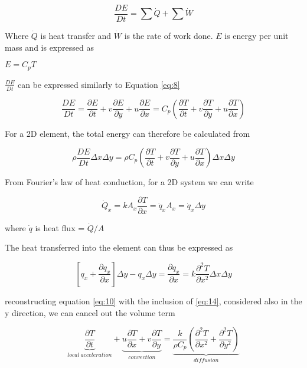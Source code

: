     \begin{equation} \label{eq:10}
      \frac{DE}{Dt} = \sum{\dot{Q}} + \sum{\dot{W}}
    \end{equation}

    Where $\dot{Q}$ is heat transfer and $\dot{W}$ is the rate of work done. $E$ is energy per unit mass and is expressed as

    \centerline{$E = C_{p} T$}

    $\frac{DE}{Dt}$ can be expressed similarly to Equation \ref{eq:8}

    \begin{equation} \label{eq:11}
      \frac{DE}{Dt} = \frac{\partial E}{\partial t} + v \frac{\partial E}{\partial y} + u \frac{\partial E}{\partial x} = C_{p} (\frac{\partial T}{\partial t} + v \frac{\partial T}{\partial y} + u \frac{\partial T}{\partial x})
    \end{equation}

    For a 2D element, the total energy can therefore be calculated from

    \begin{equation} \label{eq:12}
      \rho \frac{DE}{Dt} \Delta x \Delta y = \rho   C_{p} (\frac{\partial T}{\partial t} + v \frac{\partial T}{\partial y} + u \frac{\partial T}{\partial x}) \Delta x \Delta y
    \end{equation}

    From Fourier's law of heat conduction, for a 2D system we can write

    \begin{equation} \label{eq:13}
      \dot{Q}_{x} = k A_{x} \frac{\partial T}{\partial x} = \dot{q}_{x} A_{x} = \dot{q}_{x} \Delta y
    \end{equation}

    where $\dot{q}$ is heat flux = $\dot{Q}/A$

    The heat transferred into the element can thus be expressed as

    \begin{equation} \label{eq:14}
      [q_{x} + \frac{\partial q_{x}}{\partial x}] \Delta y - q_{x} \Delta y = \frac{\partial q_{x}}{\partial x} = k \frac{\partial^2 T}{\partial x^2} \Delta x \Delta y
    \end{equation}

    reconstructing equation \ref{eq:10} with the inclusion of \ref{eq:14}, considered also in the y direction, we can cancel out the volume term

    \begin{equation} \label{eq:15}
      \underbrace{\frac{\partial T}{\partial t}}_{local\ acceleration} + \underbrace{u \frac{\partial T}{\partial x} + v \frac{\partial T}{\partial y}}_{convection} = \underbrace{\frac{k}{\rho C_{p}} ( \frac{\partial^2 T}{\partial x^2} + \frac{\partial^2 T}{\partial y^2} )}_{diffusion}
    \end{equation}

